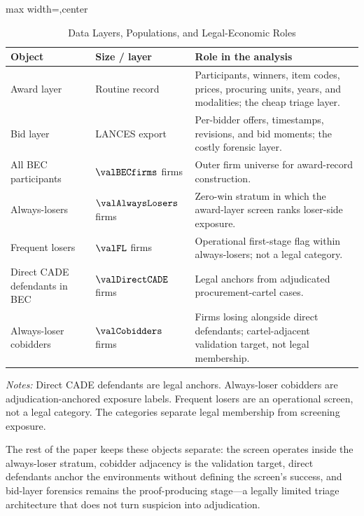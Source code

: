 \begin{table}[htbp]
\centering
\caption{Data Layers, Populations, and Legal-Economic Roles}
\label{tab:populations_submission}
\footnotesize
\begin{adjustbox}{max width=\textwidth,center}
\begin{threeparttable}
\begin{tabular}{p{3.8cm}p{2.3cm}p{7.1cm}}
\toprule
Object & Size / layer & Role in the analysis \\
\midrule
Award layer & Routine record & Participants, winners, item codes, prices, procuring units, years, and modalities; the cheap triage layer. \\
Bid layer & LANCES export & Per-bidder offers, timestamps, revisions, and bid moments; the costly forensic layer. \\
All BEC participants & $\valBECfirms$ firms & Outer firm universe for award-record construction. \\
Always-losers & $\valAlwaysLosers$ firms & Zero-win stratum in which the award-layer screen ranks loser-side exposure. \\
Frequent losers & $\valFL$ firms & Operational first-stage flag within always-losers; not a legal category. \\
Direct CADE defendants in BEC & $\valDirectCADE$ firms & Legal anchors from adjudicated procurement-cartel cases. \\
Always-loser cobidders & $\valCobidders$ firms & Firms losing alongside direct defendants; cartel-adjacent validation target, not legal membership. \\
\bottomrule
\end{tabular}
\begin{tablenotes}
\footnotesize
\item \textit{Notes:} Direct CADE defendants are legal anchors.
Always-loser cobidders are adjudication-anchored exposure labels.
Frequent losers are an operational screen, not a legal category.
The categories separate legal membership from screening exposure.
\end{tablenotes}
\end{threeparttable}
\end{adjustbox}
\end{table}

The rest of the paper keeps these objects separate: the screen
operates inside the always-loser stratum, cobidder adjacency is
the validation target, direct defendants anchor the environments
without defining the screen's success, and bid-layer forensics
remains the proof-producing stage---a legally limited triage
architecture that does not turn suspicion into adjudication.
